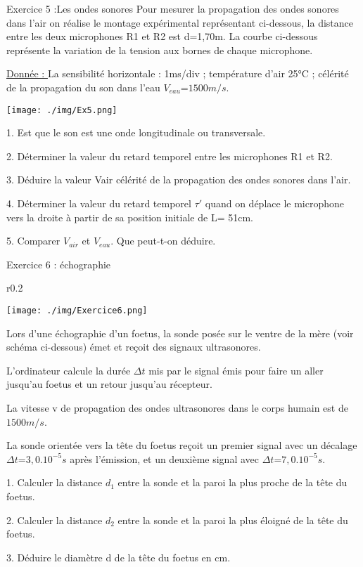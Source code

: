 \documentclass[12pt, french]{article}
\begin{document}
\vspace{-0.7cm}
\begin{Box2}{Exercice 5 :Les ondes sonores }
Pour mesurer la propagation des ondes sonores dans l’air on réalise le montage expérimental représentant ci-dessous, la distance entre les deux microphones R1 et R2 est d=1,70m. La courbe ci-dessous représente la variation de la tension aux bornes de chaque microphone.

\underline{Donnée : }La sensibilité horizontale : 1ms/div ; température d’air 25°C ; célérité de la propagation du son dans l’eau $V_{eau}$=$1500m/s$.


	\begin{center}
		\vspace{-0.5cm}
	\texttt{[image: ./img/Ex5.png]}
  \end{center}
1. Est que le son est une onde longitudinale ou transversale.

2. Déterminer la valeur du retard temporel entre les microphones R1 et R2.

3. Déduire la valeur Vair célérité de la propagation des ondes sonores dans l’air.

4. Déterminer la valeur du retard temporel $\tau'$ quand on déplace le microphone vers la droite à partir de sa position initiale de L= 51cm.

5. Comparer $V_{air}$ et $V_{eau}$. Que peut-t-on déduire.

\end{Box2}
\begin{Box2}{Exercice 6 : échographie}
\begin{wrapfigure}{r}{0.2\textwidth}
  \begin{center}
	  \vspace{-0.6cm}
	\texttt{[image: ./img/Exercice6.png]}
  \end{center}
\end{wrapfigure}
	Lors d’une échographie d’un foetus, la sonde posée sur le ventre de la mère (voir schéma ci-dessous) émet et reçoit des signaux ultrasonores.

	L’ordinateur calcule la durée $\Delta{t}$ mis par le signal émis pour faire un aller jusqu’au foetus et un retour jusqu’au récepteur.

La vitesse v de propagation des ondes ultrasonores dans le corps humain est de $1500 m/s$.

La sonde orientée vers la tête du foetus reçoit un premier signal avec un décalage
$\Delta{t}$=$3,0.10^{-5}s$ après l’émission, et un deuxième signal avec $\Delta{t}$=$7,0.10^{-5}s$.

1. Calculer la distance $d_1$ entre la sonde et la paroi la plus proche de la tête du foetus.

2. Calculer la distance $d_2$ entre la sonde et la paroi la plus éloigné de la tête du foetus.

3. Déduire le diamètre d de la tête du foetus en cm.

\end{Box2}
\end{document}
